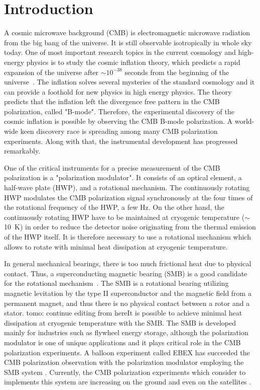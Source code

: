 \documentclass[a4paper]{jpconf}
\newcommand{\cred}[1]{{\color{red}#1}}
\begin{document}
\section*{Introduction}

A cosmic microwave background (CMB) is electromagnetic microwave radiation from the big bang of the universe.
It is still observable isotropically in whole sky today.
One of most important research topics in the current cosmology and high-energy physics is to study the cosmic inflation theory, which predicts a rapid expansion of the universe after $\sim 10^{-38}$ seconds from the beginning of the universe~\cite{inflation_sato,inflation_guth}.
The inflation solves several mysteries of the standard cosmology and it can provide a foothold for new physics in high energy physics.
The theory predicts that the inflation left the divergence free pattern in the CMB polarization,  called "B-mode".
Therefore, the experimental discovery of the cosmic inflation is possible by observing the CMB B-mode polarization.
A world-wide keen discovery race is spreading among many CMB polarization experiments.
Along with that, the instrumental development has progressed remarkably.

One of the critical instruments for a precise measurement of the CMB polarization is a "polarization modulator".
It consists of an optical element, a half-wave plate (HWP), and a rotational mechanism.
The continuously rotating HWP modulates the CMB polarization signal synchronously at the four times of the rotational frequency of the HWP, a few Hz.
On the other hand, the continuously rotating HWP have to be maintained at cryogenic temperature ($\sim$ 10~K) in order to reduce the detector noise originating from the thermal emission of the HWP itself.
It is therefore necessary to use a rotational mechanism which allows to rotate with minimal heat dissipation at cryogenic temperature.

In general mechanical bearings, there is too much frictional heat due to physical contact.
Thus, a superconducting magnetic bearing (SMB) is a good candidate for the rotational mechanism~\cite{smb}.
The SMB is a rotational bearing utilizing magnetic levitation by the type II superconductor and the magnetic field from a permanent magnet, and thus there is no physical contact between a rotor and a stator.
\cred{tomo: continue editing from here}It is possible to achieve minimal heat dissipation at cryogenic temperature with the SMB.
The SMB is developed mainly for industries such as flywheel energy storage,
although the polarization modulator is one of unique applications and it plays critical role in the CMB polarization experiments.
A balloon experiment called EBEX has succeeded the CMB polarization observation with the polarization modulator employing the SMB system \cite{ebex}.
Currently, the CMB polarization experiments which consider to implements this system are increasing on the ground and even on the satellites \cite{litebird}.
\end{document}
